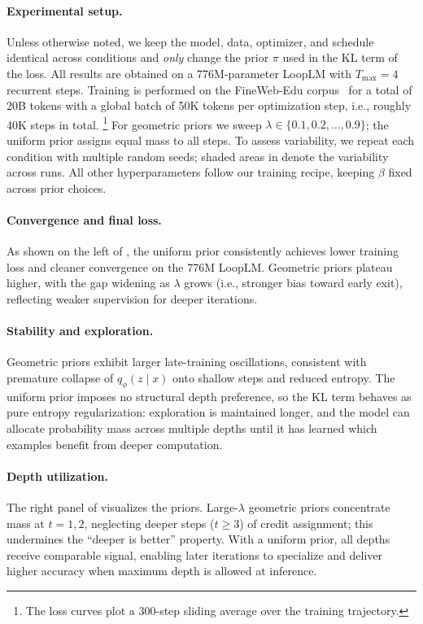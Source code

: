 \documentclass[]{bytedance_seed}
\newcommand{\1}{\mathbf{1}}
\newcommand{\ut}{LoopLM}
\begin{document}
{\paragraph{Experimental setup.}
Unless otherwise noted, we keep the model, data, optimizer, and schedule identical across conditions and \emph{only} change the prior $\pi$ used in the KL term of the loss.
All results are obtained on a 776M-parameter \ut{} with $T_{\max}=4$ recurrent steps.
Training is performed on the FineWeb-Edu corpus~\cite{penedo2024fineweb} for a total of 20B tokens with a global batch of 50K tokens per optimization step, i.e., roughly 40K steps in total.%
\footnote{The loss curves plot a 300-step sliding average over the training trajectory.}
For geometric priors we sweep $\lambda\!\in\!\{0.1,0.2,\dots,0.9\}$; the uniform prior assigns equal mass to all steps.
To assess variability, we repeat each condition with multiple random seeds; shaded areas in  denote the variability across runs.
All other hyperparameters follow our training recipe, keeping $\beta$ fixed across prior choices.

\paragraph{Convergence and final loss.}
As shown on the left of , the uniform prior consistently achieves lower training loss and cleaner convergence on the 776M \ut{}.
Geometric priors plateau higher, with the gap widening as $\lambda$ grows (i.e., stronger bias toward early exit), reflecting weaker supervision for deeper iterations.

\paragraph{Stability and exploration.}
Geometric priors exhibit larger late-training oscillations, consistent with premature collapse of $q_\phi(z\!\mid\!x)$ onto shallow steps and reduced entropy.
The uniform prior imposes no structural depth preference, so the KL term behaves as pure entropy regularization: exploration is maintained longer, and the model can allocate probability mass across multiple depths until it has learned which examples benefit from deeper computation.

\paragraph{Depth utilization.}
The right panel of  visualizes the priors.
Large-$\lambda$ geometric priors concentrate mass at $t{=}1,2$, neglecting deeper steps ($t{\ge}3$) of credit assignment; this undermines the ``deeper is better'' property.
With a uniform prior, all depths receive comparable signal, enabling later iterations to specialize and deliver higher accuracy when maximum depth is allowed at inference.

}
\end{document}
